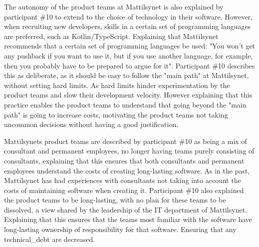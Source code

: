 The autonomy of the product teams at Mattilsynet is also explained by participant \#10 to extend to the choice of technology in their software. However, when recruiting new developers, skills in a certain set of programming languages are preferred, such as Kotlin/TypeScript. Explaining that Mattilsynet recommends that a certain set of programming languages be used: "You won't get any pushback if you want to use it, but if you use another language, for example, then you probably have to be prepared to argue for it". Participant \#10 describes this as deliberate, as it should be easy to follow the "main path" at Mattilsynet, without setting hard limits. As hard limits hinder experimentation by the product teams and slow their development velocity. However explaining that this practice enables the product teams to understand that going beyond the "main path" is going to increase costs, motivating the product teams not taking uncommon decisions without having a good justification.


Mattilsynets product teams are described by participant \#10 as being a mix of consultant and permanent employees, no longer having teams purely consisting of consultants, explaining that this ensures that both consultants and permanent employees understand the costs of creating long-lasting software. As in the past, Mattilsynet has had experiences with consultants not taking into account the costs of maintaining software when creating it. Participant \#10 also explained the product teams to be long-lasting, with no plan for these teams to be dissolved, a view shared by the leadership of the IT department of Mattilsynet. Explaining that this ensures that the teams most familiar with the software have long-lasting ownership of responsibility for that software. Ensuring that any \gls{technical_debt} are decreased.

